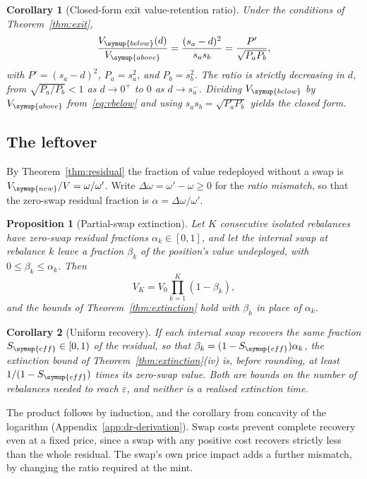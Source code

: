 \documentclass[11pt,a4paper]{article}
\theoremstyle{siphon}
\newtheorem{corollary}{Corollary}[theorem]
\newtheorem{proposition}[theorem]{Proposition}
\begin{document}
\begin{corollary}[Closed-form exit value-retention ratio]\label{cor:exit-ratio}
Under the conditions of Theorem~\ref{thm:exit},
\[
\frac{V_{\symup{below}}(d)}{V_{\symup{above}}}
=
\frac{(s_a - d)^2}{s_a s_b}
=
\frac{P'}{\sqrt{P_a P_b}},
\]
with $P' = (s_a - d)^2$, $P_a = s_a^2$, and $P_b = s_b^2$. The ratio is strictly decreasing in $d$, from $\sqrt{P_a/P_b} < 1$ as $d \to 0^+$ to $0$ as $d \to s_a^-$. Dividing $V_{\symup{below}}$ by $V_{\symup{above}}$ from~\eqref{eq:vbelow} and using $s_a s_b = \sqrt{P_a P_b}$ yields the closed form.
\end{corollary}

\subsection{The leftover}\label{sec:leftover}

By Theorem~\ref{thm:residual} the fraction of value redeployed without a swap is $V_{\symup{new}}/V = \omega/\omega'$. Write $\Delta\omega = \omega' - \omega \geq 0$ for the \emph{ratio mismatch}, so that the zero-swap residual fraction is $\alpha = \Delta\omega/\omega'$.

\begin{proposition}[Partial-swap extinction]\label{prop:partial}
Let $K$ consecutive isolated rebalances have zero-swap residual fractions $\alpha_k \in [0,1]$, and let the internal swap at rebalance $k$ leave a fraction $\beta_k$ of the position's value undeployed, with $0 \leq \beta_k \leq \alpha_k$. Then
\[
V_K = V_0 \prod_{k=1}^{K} (1 - \beta_k),
\]
and the bounds of Theorem~\ref{thm:extinction} hold with $\beta_k$ in place of $\alpha_k$.
\end{proposition}

\begin{corollary}[Uniform recovery]\label{cor:uniform-recovery}
If each internal swap recovers the same fraction $S_{\symup{eff}} \in [0,1)$ of the residual, so that $\beta_k = (1 - S_{\symup{eff}})\alpha_k$, the extinction bound of Theorem~\ref{thm:extinction}(iv) is, before rounding, at least $1/(1 - S_{\symup{eff}})$ times its zero-swap value. Both are bounds on the number of rebalances needed to reach $\varepsilon$, and neither is a realised extinction time.
\end{corollary}

\noindent The product follows by induction, and the corollary from concavity of the logarithm (Appendix~\ref{app:dr-derivation}). Swap costs prevent complete recovery even at a fixed price, since a swap with any positive cost recovers strictly less than the whole residual. The swap's own price impact adds a further mismatch, by changing the ratio required at the mint.
\end{document}
